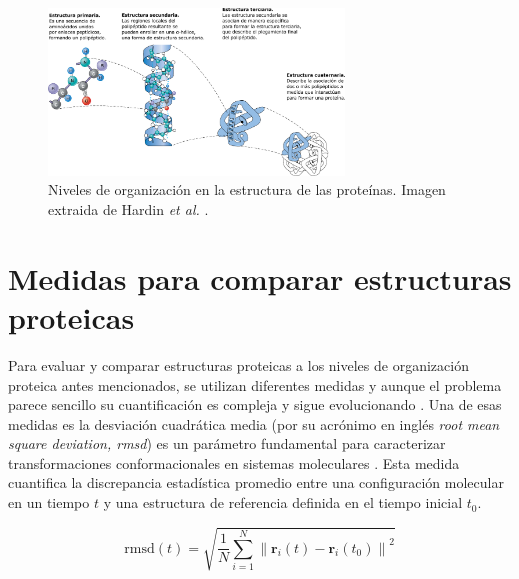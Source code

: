 \begin{figure}[H]
	\centering
	\includegraphics[width=0.7\textwidth]{graphs/niveles.pdf}
	\caption{Niveles de organizaci\'{o}n en la estructura de las prote\'{i}nas. Imagen extraida de Hardin \textit{et al.} \cite{Hardin2022}.}
	\label{fig:nivelesP}
\end{figure}

\section{Medidas para comparar estructuras proteicas}

Para evaluar y comparar estructuras proteicas a los niveles de organización proteica antes mencionados, se utilizan diferentes medidas y aunque el problema parece sencillo su cuantiﬁcaci\'{o}n es compleja y sigue evolucionando \cite{Kufareva2012}. Una de esas medidas es la desviaci\'{o}n cuadr\'{a}tica media (por su acrónimo en inglés \textit{root mean square deviation, rmsd}) es un par\'{a}metro fundamental para caracterizar transformaciones conformacionales en sistemas moleculares \cite{Santamaria2023}. Esta medida cuantifica la discrepancia estad\'{i}stica promedio entre una configuraci\'{o}n molecular en un tiempo $t$ y una estructura de referencia definida en el tiempo inicial $t_0$.

\begin{equation}
	\text{rmsd}(t) = \sqrt{ \frac{1}{N} \sum_{i=1}^{N} \left\| \mathbf{r}_i(t) - \mathbf{r}_i(t_0) \right\|^2 }
	\label{rmsd}
\end{equation}

